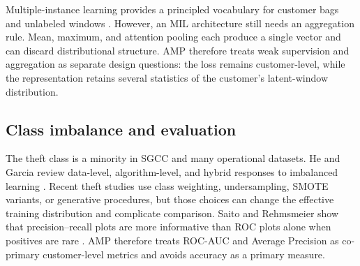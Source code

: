 Multiple-instance learning provides a principled vocabulary for customer bags and unlabeled windows \cite{Carbonneau2018MILSurvey}. However, an MIL architecture still needs an aggregation rule. Mean, maximum, and attention pooling each produce a single vector and can discard distributional structure. AMP therefore treats weak supervision and aggregation as separate design questions: the loss remains customer-level, while the representation retains several statistics of the customer's latent-window distribution.

\subsection{Class imbalance and evaluation}

The theft class is a minority in SGCC and many operational datasets. He and Garcia review data-level, algorithm-level, and hybrid responses to imbalanced learning \cite{He2009Imbalanced}. Recent theft studies use class weighting, undersampling, SMOTE variants, or generative procedures, but those choices can change the effective training distribution and complicate comparison. Saito and Rehmsmeier show that precision--recall plots are more informative than ROC plots alone when positives are rare \cite{Saito2015PR}. AMP therefore treats ROC-AUC and Average Precision as co-primary customer-level metrics and avoids accuracy as a primary measure.
